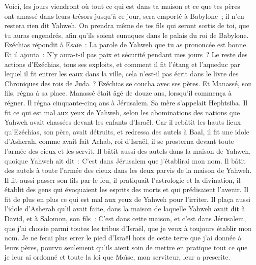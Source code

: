 \begin{multicols}{2}
Voici, les jours viendront où tout ce qui est dans ta maison et ce que tes pères ont amassé dans leurs trésors jusqu'à ce jour, sera emporté à Babylone~; il n'en restera rien dit Yahweh.
On prendra même de tes fils qui seront sortis de toi, que tu auras engendrés, afin qu'ils soient eunuques dans le palais du roi de Babylone.
Ezéchias répondit à Esaïe~: La parole de Yahweh que tu as prononcée est bonne. Et il ajouta~: N'y aura-t-il pas paix et sécurité pendant mes jours~?
Le reste des actions d'Ezéchias, tous ses exploits, et comment il fit l'étang et l'aqueduc par lequel il fit entrer les eaux dans la ville, cela n'est-il pas écrit dans le livre des Chroniques des rois de Juda~?
Ezéchias se coucha avec ses pères. Et Manassé, son fils, régna à sa place.
\VerseOne{}Manassé était âgé de douze ans, lorsqu'il commença à régner. Il régna cinquante-cinq ans à Jérusalem. Sa mère s'appelait Hephtsiba.
Il fit ce qui est mal aux yeux de Yahweh, selon les abominations des nations que Yahweh avait chassées devant les enfants d'Israël.
Car il rebâtit les hauts lieux qu'Ezéchias, son père, avait détruits, et redressa des autels à Baal, il fit une idole d'Asherah, comme avait fait Achab, roi d'Israël, il se prosterna devant toute l'armée des cieux et les servit.
Il bâtit aussi des autels dans la maison de Yahweh, quoique Yahweh ait dit~: C'est dans Jérusalem que j'établirai mon nom.
Il bâtit des autels à toute l'armée des cieux dans les deux parvis de la maison de Yahweh.
Il fit aussi passer son fils par le feu, il pratiquait l'astrologie et la divination, il établit des gens qui évoquaient les esprits des morts et qui prédisaient l'avenir. Il fit de plus en plus ce qui est mal aux yeux de Yahweh pour l'irriter.
Il plaça aussi l'idole d'Asherah qu'il avait faite, dans la maison de laquelle Yahweh avait dit à David, et à Salomon, son fils~: C'est dans cette maison, et c'est dans Jérusalem, que j'ai choisie parmi toutes les tribus d'Israël, que je veux à toujours établir mon nom.
Je ne ferai plus errer le pied d'Israël hors de cette terre que j'ai donnée à leurs pères, pourvu seulement qu'ils aient soin de mettre en pratique tout ce que je leur ai ordonné et toute la loi que Moïse, mon serviteur, leur a prescrite.

\end{multicols}
